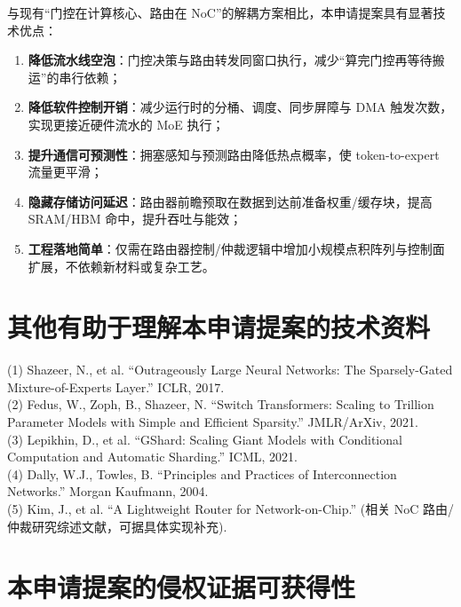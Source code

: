 \documentclass[12pt,a4paper]{article}
\begin{document}
与现有“门控在计算核心、路由在 NoC”的解耦方案相比，本申请提案具有显著技术优点：
\begin{enumerate}
    \item \textbf{降低流水线空泡}：门控决策与路由转发同窗口执行，减少“算完门控再等待搬运”的串行依赖；
    \item \textbf{降低软件控制开销}：减少运行时的分桶、调度、同步屏障与 DMA 触发次数，实现更接近硬件流水的 MoE 执行；
    \item \textbf{提升通信可预测性}：拥塞感知与预测路由降低热点概率，使 token-to-expert 流量更平滑；
    \item \textbf{隐藏存储访问延迟}：路由器前瞻预取在数据到达前准备权重/缓存块，提高 SRAM/HBM 命中，提升吞吐与能效；
    \item \textbf{工程落地简单}：仅需在路由器控制/仲裁逻辑中增加小规模点积阵列与控制面扩展，不依赖新材料或复杂工艺。
\end{enumerate}

\section{其他有助于理解本申请提案的技术资料}

(1) Shazeer, N., et al. ``Outrageously Large Neural Networks: The Sparsely-Gated Mixture-of-Experts Layer.'' ICLR, 2017. \\
(2) Fedus, W., Zoph, B., Shazeer, N. ``Switch Transformers: Scaling to Trillion Parameter Models with Simple and Efficient Sparsity.'' JMLR/ArXiv, 2021. \\
(3) Lepikhin, D., et al. ``GShard: Scaling Giant Models with Conditional Computation and Automatic Sharding.'' ICML, 2021. \\
(4) Dally, W.J., Towles, B. ``Principles and Practices of Interconnection Networks.'' Morgan Kaufmann, 2004. \\
(5) Kim, J., et al. ``A Lightweight Router for Network-on-Chip.'' (相关 NoC 路由/仲裁研究综述文献，可据具体实现补充).

\section{本申请提案的侵权证据可获得性}
\end{document}
